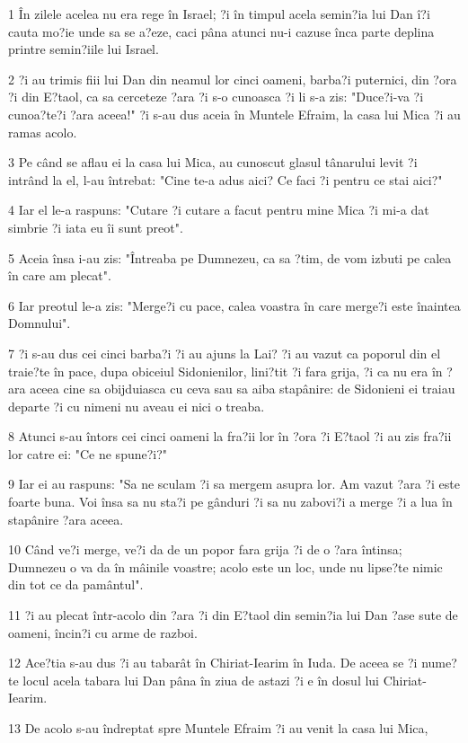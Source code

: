 \par 1 În zilele acelea nu era rege în Israel; ?i în timpul acela semin?ia lui Dan î?i cauta mo?ie unde sa se a?eze, caci pâna atunci nu-i cazuse înca parte deplina printre semin?iile lui Israel.
\par 2 ?i au trimis fiii lui Dan din neamul lor cinci oameni, barba?i puternici, din ?ora ?i din E?taol, ca sa cerceteze ?ara ?i s-o cunoasca ?i li s-a zis: "Duce?i-va ?i cunoa?te?i ?ara aceea!" ?i s-au dus aceia în Muntele Efraim, la casa lui Mica ?i au ramas acolo.
\par 3 Pe când se aflau ei la casa lui Mica, au cunoscut glasul tânarului levit ?i intrând la el, l-au întrebat: "Cine te-a adus aici? Ce faci ?i pentru ce stai aici?"
\par 4 Iar el le-a raspuns: "Cutare ?i cutare a facut pentru mine Mica ?i mi-a dat simbrie ?i iata eu îi sunt preot".
\par 5 Aceia însa i-au zis: "Întreaba pe Dumnezeu, ca sa ?tim, de vom izbuti pe calea în care am plecat".
\par 6 Iar preotul le-a zis: "Merge?i cu pace, calea voastra în care merge?i este înaintea Domnului".
\par 7 ?i s-au dus cei cinci barba?i ?i au ajuns la Lai? ?i au vazut ca poporul din el traie?te în pace, dupa obiceiul Sidonienilor, lini?tit ?i fara grija, ?i ca nu era în ?ara aceea cine sa obijduiasca cu ceva sau sa aiba stapânire: de Sidonieni ei traiau departe ?i cu nimeni nu aveau ei nici o treaba.
\par 8 Atunci s-au întors cei cinci oameni la fra?ii lor în ?ora ?i E?taol ?i au zis fra?ii lor catre ei: "Ce ne spune?i?"
\par 9 Iar ei au raspuns: "Sa ne sculam ?i sa mergem asupra lor. Am vazut ?ara ?i este foarte buna. Voi însa sa nu sta?i pe gânduri ?i sa nu zabovi?i a merge ?i a lua în stapânire ?ara aceea.
\par 10 Când ve?i merge, ve?i da de un popor fara grija ?i de o ?ara întinsa; Dumnezeu o va da în mâinile voastre; acolo este un loc, unde nu lipse?te nimic din tot ce da pamântul".
\par 11 ?i au plecat într-acolo din ?ara ?i din E?taol din semin?ia lui Dan ?ase sute de oameni, încin?i cu arme de razboi.
\par 12 Ace?tia s-au dus ?i au tabarât în Chiriat-Iearim în Iuda. De aceea se ?i nume?te locul acela tabara lui Dan pâna în ziua de astazi ?i e în dosul lui Chiriat-Iearim.
\par 13 De acolo s-au îndreptat spre Muntele Efraim ?i au venit la casa lui Mica,
